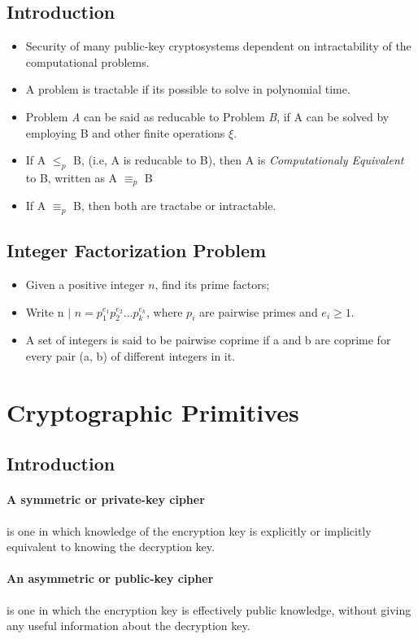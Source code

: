 \documentclass[12pt]{article}
\begin{document}
\subsection{Introduction}
\begin{itemize}
\item Security of many public-key cryptosystems dependent on intractability of the computational problems.
\item A problem is tractable if its possible to solve in polynomial time.
\item Problem \textit{A} can be said as reducable to Problem \textit{B}, if A can be solved by employing B and other finite operations $\xi.$
\item If A $\leq_{p}$ B, (i.e, A is reducable to B), then A is \textit{Computationaly Equivalent} to B, written as A $\equiv_{p}$ B
\item If  A $\equiv_{p}$ B, then both are tractabe or intractable.
\end{itemize} 

\subsection{Integer Factorization Problem}
\begin{itemize}
\item Given a positive integer $\textit{n}$, find its prime factors;
\item Write n $\mid$ $n = p_{1}^{e_{1}}p_{2}^{e_{2}}...p_{k}^{e_{k}}$, where $p_{i}$ are pairwise primes and $e_{i} \geq 1.$
\item  A set of integers is said to be pairwise coprime if a and b are coprime for every pair (a, b) of different integers in it.
\end{itemize}

\section{Cryptographic Primitives}
\subsection{Introduction}
\paragraph{A symmetric or private-key cipher} is one in which knowledge of the encryption key is explicitly or implicitly equivalent to knowing the decryption key.
\paragraph{An asymmetric or public-key cipher} is one in which the encryption key is effectively public knowledge, without giving any useful information about the decryption key.
\end{document}

